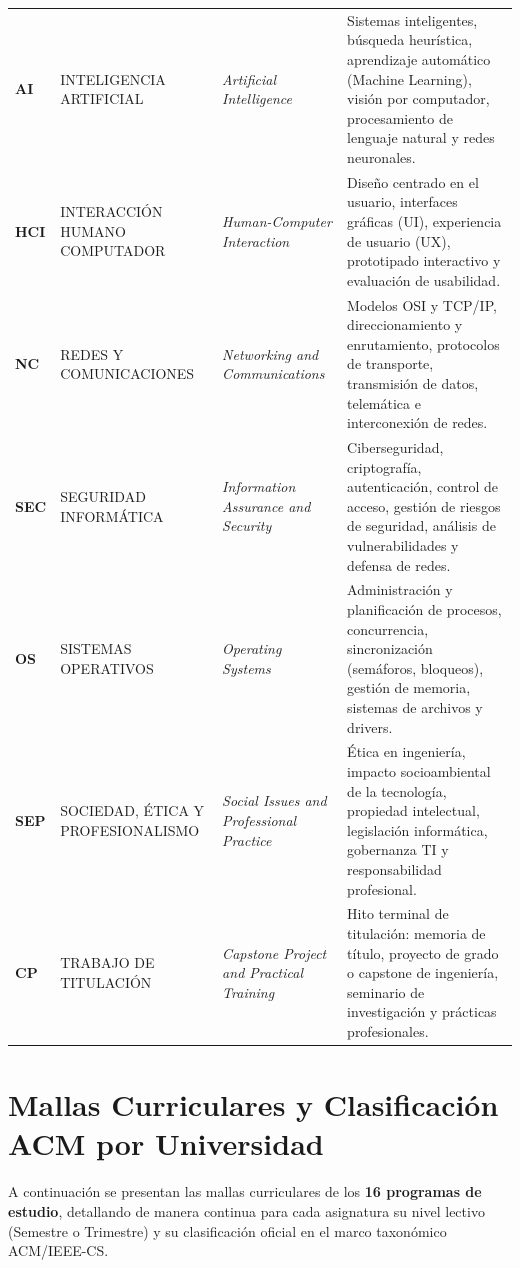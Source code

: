 \documentclass[11pt,a4paper]{article}
\begin{document}
\begin{small}
\begin{longtable}{p{0.9cm} >{\raggedright\arraybackslash}p{4.4cm} >{\raggedright\arraybackslash}p{4.0cm} >{\raggedright\arraybackslash}p{5.4cm}}
\textbf{AI} & INTELIGENCIA ARTIFICIAL & \textit{Artificial Intelligence} & Sistemas inteligentes, búsqueda heurística, aprendizaje automático (Machine Learning), visión por computador, procesamiento de lenguaje natural y redes neuronales. \\
\textbf{HCI} & INTERACCIÓN HUMANO COMPUTADOR & \textit{Human-Computer Interaction} & Diseño centrado en el usuario, interfaces gráficas (UI), experiencia de usuario (UX), prototipado interactivo y evaluación de usabilidad. \\
\textbf{NC} & REDES Y COMUNICACIONES & \textit{Networking and Communications} & Modelos OSI y TCP/IP, direccionamiento y enrutamiento, protocolos de transporte, transmisión de datos, telemática e interconexión de redes. \\
\textbf{SEC} & SEGURIDAD INFORMÁTICA & \textit{Information Assurance and Security} & Ciberseguridad, criptografía, autenticación, control de acceso, gestión de riesgos de seguridad, análisis de vulnerabilidades y defensa de redes. \\
\textbf{OS} & SISTEMAS OPERATIVOS & \textit{Operating Systems} & Administración y planificación de procesos, concurrencia, sincronización (semáforos, bloqueos), gestión de memoria, sistemas de archivos y drivers. \\
\textbf{SEP} & SOCIEDAD, ÉTICA Y PROFESIONALISMO & \textit{Social Issues and Professional Practice} & Ética en ingeniería, impacto socioambiental de la tecnología, propiedad intelectual, legislación informática, gobernanza TI y responsabilidad profesional. \\
\textbf{CP} & TRABAJO DE TITULACIÓN & \textit{Capstone Project and Practical Training} & Hito terminal de titulación: memoria de título, proyecto de grado o capstone de ingeniería, seminario de investigación y prácticas profesionales. \\
\end{longtable}
\end{small}

\newpage

\renewcommand{\arraystretch}{0.92}
\section{\texorpdfstring{\sffamily\color{UsachNavy} Mallas Curriculares y Clasificación ACM por Universidad}{Mallas Curriculares y Clasificación ACM por Universidad}}

A continuación se presentan las mallas curriculares de los \textbf{16 programas de estudio}, detallando de manera continua para cada asignatura su nivel lectivo (Semestre o Trimestre) y su clasificación oficial en el marco taxonómico ACM/IEEE-CS.
\end{document}
